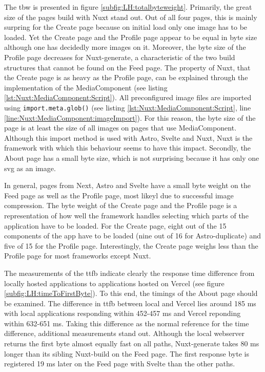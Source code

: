 \documentclass[a4paper, 10pt]{article}
\begin{document}
The \acrlong{tbw} is presented in figure \ref{subfig:LH:totalbyteweight}.
Primarily, the great size of the pages build with Nuxt stand out.
Out of all four pages, this is mainly surpring for the Create page because on initial load only one image has to be loaded.
Yet the Create page and the Profile page appear to be equal in byte size although one has decidedly more images on it.
Moreover, the byte size of the Profile page decreases for Nuxt-generate, a characteristic of the two build structures that cannot be found on the Feed page.
The property of Nuxt, that the Create page is as heavy as the Profile page, can be explained through the implementation of the MediaComponent (see listing \ref{lst:Nuxt:MediaComponent:Script}).
All preconfigured image files are imported using \lstinline{import.meta.glob()} (see listing \ref{lst:Nuxt:MediaComponent:Script}, line \ref{line:Nuxt:MediaComponent:imageImport}).
For this reason, the byte size of the page is at least the size of all images on pages that use MediaComponent.
Although this import method is used with Astro, Svelte and Nuxt, Nuxt is the framework with which this behaviour seems to have this impact.
Secondly, the About page has a small byte size, which is not surprising because it has only one \acrshort{svg} as an image.

In general, pages from Next, Astro and Svelte have a small byte weight on the Feed page as well as the Profile page, most likeyl due to successful image compression.
The byte weight of the Create page and the Profile page is a representation of how well the framework handles selecting which parts of the application have to be loaded.
For the Create page, eight out of the 15 components of the app have to be loaded (nine out of 16 for Astro-duplicate) and five of 15 for the Profile page.
Interestingly, the Create page weighs less than the Profile page for most frameworks except Nuxt.

The measurements of the \acrlong{ttfb} indicate clearly the response time difference from locally hosted applications to applications hosted on Vercel (see figure \ref{subfig:LH:timeToFirstByte}).
To this end, the timings of the About page should be examined.
The difference in \acrshort{ttfb} between local and Vercel lies around 185 ms with local applications responding within 452-457 ms and Vercel reponding within 632-651 ms.
Taking this difference as the normal reference for the time difference, additional measurements stand out.
Although the local webserver returns the first byte almost equally fast on all paths, Nuxt-generate takes 80 ms longer than its sibling Nuxt-build on the Feed page.
The first response byte is registered 19 ms later on the Feed page with Svelte than the other paths.
\end{document}
